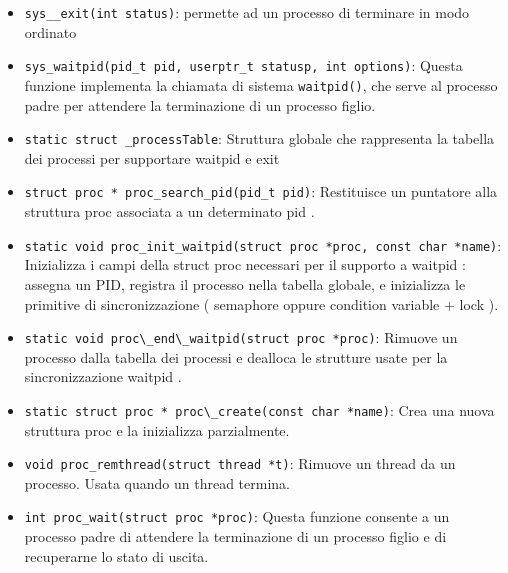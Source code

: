 \begin{itemize}
  \item \verb|sys__exit(int status)|: permette ad un processo di terminare in modo ordinato
  \item \verb|sys_waitpid(pid_t pid, userptr_t statusp, int options)|: Questa funzione implementa la chiamata di sistema \verb|waitpid()|, che serve al
        processo padre per attendere la terminazione di un processo figlio.
  \item \verb|static struct _processTable|: Struttura globale che rappresenta la tabella dei processi per supportare waitpid
        e exit
  \item \verb|struct proc * proc_search_pid(pid_t pid)|: Restituisce un puntatore alla struttura proc associata a un determinato pid .
  \item \verb|static void proc_init_waitpid(struct proc *proc, const char *name)|: Inizializza i campi della struct proc necessari per il supporto a waitpid : assegna
        un PID, registra il processo nella tabella globale, e inizializza le primitive di
        sincronizzazione ( semaphore oppure condition variable + lock ).
  \item \verb|static void proc\_end\_waitpid(struct proc *proc)|: Rimuove un
        processo dalla tabella dei processi e dealloca le strutture usate per la
        sincronizzazione waitpid .
  \item \verb|static struct proc * proc\_create(const char *name)|: Crea una
        nuova struttura proc e la inizializza parzialmente.
  \item \verb|void proc_remthread(struct thread *t)|: Rimuove un thread da un processo. Usata quando un thread termina.
  \item \verb|int proc_wait(struct proc *proc)|: Questa funzione consente a un processo padre di attendere la terminazione di
        un processo figlio e di recuperarne lo stato di uscita.
\end{itemize}



